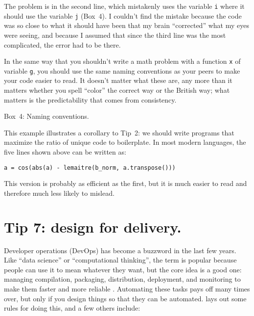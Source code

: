 \documentclass[10pt,letterpaper]{article}
\begin{document}
The problem is in the second line,
which mistakenly uses the variable \texttt{i} where it should use the variable \texttt{j} \colorbox{green!30}{(Box~4)}.
I couldn't find the mistake because
the code was so close to what it should have been that my brain ``corrected'' what my eyes were seeing,
and because I assumed that since the third line was the most complicated,
the error had to be there.

\begin{mdframed}
  \noindent
  In the same way that you shouldn't write a math problem with a function \texttt{x} of variable \texttt{g},
  you should use the same naming conventions as your peers
  to make your code easier to read.
  It doesn't matter what these are,
  any more than it matters whether you spell ``color'' the correct way or the British way;
  what matters is the predictability that comes from consistency.

  \noindent
  \colorbox{green!30}{Box~4: Naming conventions.}
\end{mdframed}

This example illustrates a corollary to Tip~2:
we should write programs that maximize the ratio of unique code to boilerplate.
In most modern languages,
the five lines shown above can be written as:

\begin{lstlisting}
a = cos(abs(a) - lemaitre(b_norm, a.transpose()))
\end{lstlisting}

\noindent
This version is probably as efficient as the first,
but it is much easier to read and therefore much less likely to mislead.

\section*{Tip 7: design for delivery.}

Developer operations (DevOps) has become a buzzword in the last few years.
Like ``data science'' or ``computational thinking'',
the term is popular because people can use it to mean whatever they want,
but the core idea is a good one:
managing compilation, packaging, distribution, deployment, and monitoring
to make them faster and more reliable \cite{Kim2016,Forsgren2018}.
Automating these tasks pays off many times over,
but only if you design things so that they can be automated.
\cite{Taschuk2017} lays out some rules for doing this,
and a few others include:
\end{document}
